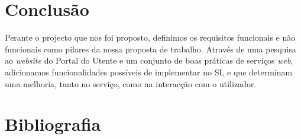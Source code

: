 \documentclass[12pt, a4paper, twoside]{report} %
\begin{document}
\chapter{Conclusão}

Perante o projecto que nos foi proposto, definimos os requisitos funcionais e não funcionais como pilares da nossa proposta de trabalho. 
Através de uma pesquisa ao \textit {website} do Portal do Utente e um conjunto de boas práticas de serviços \textit {web}, adicionamos funcionalidades possíveis de implementar no SI, e que determinam uma melhoria, tanto no serviço, como na interacção com o utilizador.

\chapter{Bibliografia}

\end{document}
